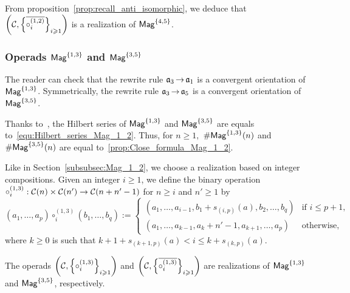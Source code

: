 From proposition~\ref{prop:recall_anti_isomorphic}, we deduce that
$\left(\mathcal{C},
 \left\{\overline{\circ_i^{(1,2)}}\right\}_{i \geqslant 1}\right)$
is a realization of $\mathsf{Mag}^{\{4, 5\}}$.
\medbreak

\subsubsection{Operads $\mathsf{Mag}^{\{1, 3\}}$ and $\mathsf{Mag}^{\{3, 5\}}$}
The reader can check that the rewrite rule $\mathfrak{a}_3 \operatorname{\to} \mathfrak{a}_1$ is a
convergent orientation of $\mathsf{Mag}^{\{1, 3\}}$. Symmetrically, the rewrite
rule $\mathfrak{a}_3 \operatorname{\to} \mathfrak{a}_5$ is a convergent orientation of
$\mathsf{Mag}^{\{3, 5\}}$.
\medbreak

Thanks to~\cite{Gir18}, the Hilbert series of $\mathsf{Mag}^{\{1, 3\}}$ and
$\mathsf{Mag}^{\{3, 5\}}$ are equals to~\eqref{equ:Hilbert_series_Mag_1_2}. Thus,
for $n \geq 1,$ $\# \mathsf{Mag}^{\{1, 3\}}(n)$ and $\# \mathsf{Mag}^{\{3, 5\}}(n)$ are
equal to~\eqref{prop:Close_formula_Mag_1_2}.
\medbreak

Like in Section~\ref{subsubsec:Mag_1_2}, we choose a realization based on
integer compositions. Given an integer $i \geq 1$, we define the
binary operation
$\circ_i^{(1,3)} : \mathcal{C}(n) \times \mathcal{C}(n')\rightarrow
\mathcal{C}(n + n' -1)$ for
$n \geq i$ and $n' \geq 1$ by
\begin{equation}
    \left(a_1, \dots, a_p\right) \circ_i^{(1,3)}
    \left(b_1, \dots, b_{q}\right)
    :=
    \begin{cases}
        \left(a_1, \dots ,a_{i-1}, b_1 + s_{(i,p)}(a),
        b_2,\dots,b_{q}\right) &
        \mbox{if } i \leq p + 1, \\
        \left(a_1, \dots, a_{k-1}, a_{k} + n'-1, a_{k+1},
        \dots,a_{p}\right)
            & \mbox{otherwise},
    \end{cases}
\end{equation}
where $k \geq 0$ is such that
$k+1 + s_{(k+1,p)}(a) < i \leq k + s_{(k,p)}(a)$.
\medbreak

\begin{Proposition} \label{prop:Realisation_Mag_1_3}
The operads
$\left(\mathcal{C}, \left\{\circ_i^{(1,3)}\right\}_{i \geqslant 1}\right)$
and
$\left(\mathcal{C}, \left\{\overline{\circ_i^{(1,3)}}\right\}_{i \geqslant 1}
\right)$ are realizations of $\mathsf{Mag}^{\{1, 3\}}$ and $\mathsf{Mag}^{\{3, 5\}}$, 
respectively.
\end{Proposition}

